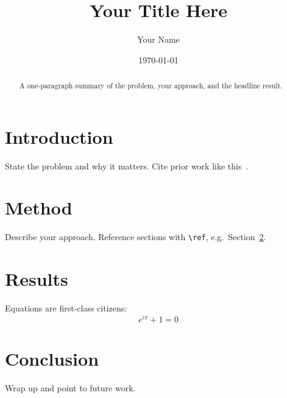 \documentclass[11pt]{article}
\title{Your Title Here}
\author{Your Name}
\date{\today}
\begin{document}
\maketitle

\begin{abstract}
A one-paragraph summary of the problem, your approach, and the headline result.
\end{abstract}

\section{Introduction}
State the problem and why it matters. Cite prior work like this~\cite{knuth1984}.

\section{Method}
\label{sec:method}
Describe your approach. Reference sections with \verb|\ref|, e.g.\ Section~\ref{sec:method}.

\section{Results}
Equations are first-class citizens:
\begin{equation}
  \label{eq:euler}
  e^{i\pi} + 1 = 0
\end{equation}

\section{Conclusion}
Wrap up and point to future work.

\printbibliography
\end{document}
